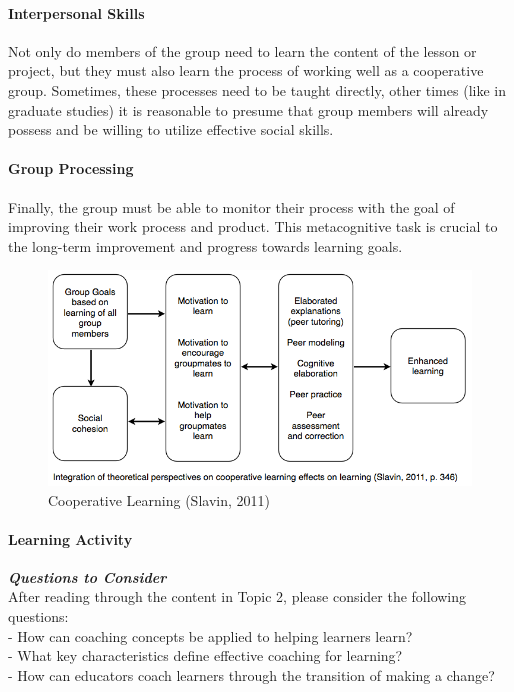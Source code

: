 \documentclass[
]{book}
\begin{document}
\hypertarget{interpersonal-skills}{%
\paragraph*{Interpersonal Skills}\label{interpersonal-skills}}

Not only do members of the group need to learn the content of the lesson or project, but they must also learn the process of working well as a cooperative group. Sometimes, these processes need to be taught directly, other times (like in graduate studies) it is reasonable to presume that group members will already possess and be willing to utilize effective social skills.

\hypertarget{group-processing}{%
\paragraph*{Group Processing}\label{group-processing}}

Finally, the group must be able to monitor their process with the goal of improving their work process and product. This metacognitive task is crucial to the long-term improvement and progress towards learning goals.

\begin{figure}
\centering
\includegraphics{assets/u3/Image3.png}
\caption{Cooperative Learning (Slavin, 2011)}
\end{figure}

\begin{reflect}
\hypertarget{learning-activity}{%
\paragraph*{Learning Activity}\label{learning-activity}}

\textbf{\emph{Questions to Consider}}\\
After reading through the content in Topic 2, please consider the
following questions:\\
- How can coaching concepts be applied to helping learners learn?\\
- What key characteristics define effective coaching for learning?\\
- How can educators coach learners through the transition of making a
change?
\end{reflect}
\end{document}
